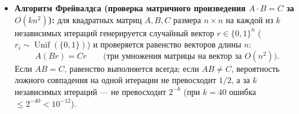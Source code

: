 \documentclass[10pt,a4paper]{article}
\renewcommand{\le}{\leqslant}
\DeclareMathOperator{\Unif}{Unif}
\begin{document}
\begin{itemize}
  \item \textbf{Алгоритм Фрейвалдса (проверка матричного произведения $A \cdot B = C$ за $O(k n^2)$):} для квадратных матриц $A, B, C$ размера $n \times n$ на каждой из $k$ независимых итераций генерируется случайный вектор $r \in \{0, 1\}^n$ ($r_i \sim \Unif(\{0, 1\})$) и проверяется равенство векторов длины $n$:
  \[
    A(Br) = Cr \qquad \bigl(\text{три умножения матрицы на вектор за } O(n^2)\bigr).
  \]
  Если $AB = C$, равенство выполняется всегда; если $AB \ne C$, вероятность ложного совпадения на одной итерации не превосходит $1/2$, а за $k$ независимых итераций — не превосходит $2^{-k}$ (при $k = 40$ ошибка $\le 2^{-40} < 10^{-12}$).
\end{itemize}
\end{document}
